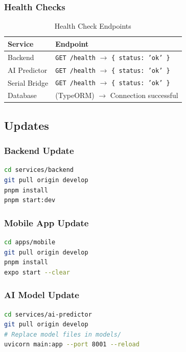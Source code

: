 \documentclass[12pt,a4paper,oneside]{article}
\begin{document}
\subsubsection{Health Checks}
\begin{table}[H]
    \centering
    \begin{tabularx}{\textwidth}{ll}
        \toprule
        \textbf{Service} & \textbf{Endpoint} \\
        \midrule
        Backend & \texttt{GET /health} $\rightarrow$ \texttt{\{ status: 'ok' \}} \\
        AI Predictor & \texttt{GET /health} $\rightarrow$ \texttt{\{ status: 'ok' \}} \\
        Serial Bridge & \texttt{GET /health} $\rightarrow$ \texttt{\{ status: 'ok' \}} \\
        Database & (TypeORM) $\rightarrow$ Connection successful \\
        \bottomrule
    \end{tabularx}
    \caption{Health Check Endpoints}
\end{table}

\subsection{Updates}

\subsubsection{Backend Update}
\begin{lstlisting}[language=bash]
cd services/backend
git pull origin develop
pnpm install
pnpm start:dev
\end{lstlisting}

\subsubsection{Mobile App Update}
\begin{lstlisting}[language=bash]
cd apps/mobile
git pull origin develop
pnpm install
expo start --clear
\end{lstlisting}

\subsubsection{AI Model Update}
\begin{lstlisting}[language=bash]
cd services/ai-predictor
git pull origin develop
# Replace model files in models/
uvicorn main:app --port 8001 --reload
\end{lstlisting}
\end{document}
